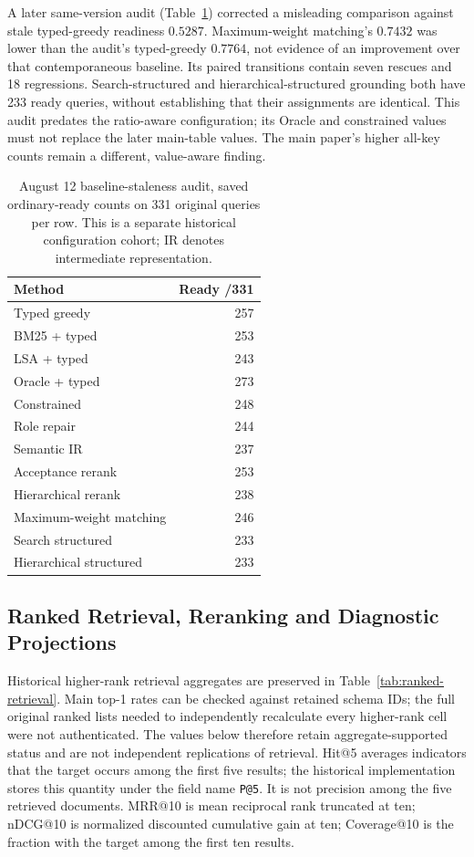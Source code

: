 A later same-version audit (Table~\ref{tab:staleness-grounding}) corrected a misleading comparison against stale typed-greedy readiness $0.5287$. Maximum-weight matching's $0.7432$ was lower than the audit's typed-greedy $0.7764$, not evidence of an improvement over that contemporaneous baseline. Its paired transitions contain seven rescues and 18 regressions. Search-structured and hierarchical-structured grounding both have 233 ready queries, without establishing that their assignments are identical. This audit predates the ratio-aware configuration; its Oracle and constrained values must not replace the later main-table values. The main paper's higher all-key counts remain a different, value-aware finding.

\begin{table}[htbp]\centering\small
\caption{August 12 baseline-staleness audit, saved ordinary-ready counts on 331 original queries per row. This is a separate historical configuration cohort; IR denotes intermediate representation.}\label{tab:staleness-grounding}
\begin{tabular}{@{}lr@{}}\toprule
Method & Ready /331\\\midrule
Typed greedy & 257\\
BM25 + typed & 253\\
LSA + typed & 243\\
Oracle + typed & 273\\
Constrained & 248\\
Role repair & 244\\
Semantic IR & 237\\
Acceptance rerank & 253\\
Hierarchical rerank & 238\\
Maximum-weight matching & 246\\
Search structured & 233\\
Hierarchical structured & 233\\
\bottomrule\end{tabular}\end{table}

\subsection{Ranked Retrieval, Reranking and Diagnostic Projections}
Historical higher-rank retrieval aggregates are preserved in Table~\ref{tab:ranked-retrieval}. Main top-1 rates can be checked against retained schema IDs; the full original ranked lists needed to independently recalculate every higher-rank cell were not authenticated. The values below therefore retain aggregate-supported status and are not independent replications of retrieval. Hit@5 averages indicators that the target occurs among the first five results; the historical implementation stores this quantity under the field name \texttt{P@5}. It is not precision among the five retrieved documents. MRR@10 is mean reciprocal rank truncated at ten; nDCG@10 is normalized discounted cumulative gain at ten; Coverage@10 is the fraction with the target among the first ten results.

